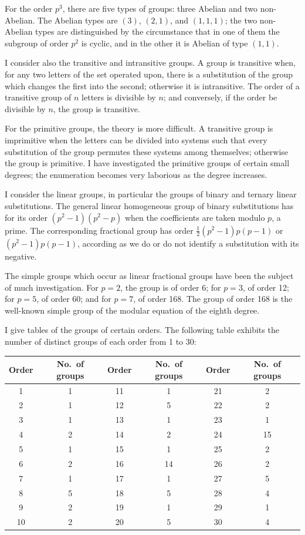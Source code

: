 \documentclass[11pt,a4paper]{book}
\begin{document}
For the order $p^3$, there are five types of groups: three Abelian and two non-Abelian. The Abelian types are $(3)$, $(2,1)$, and $(1,1,1)$; the two non-Abelian types are distinguished by the circumstance that in one of them the subgroup of order $p^2$ is cyclic, and in the other it is Abelian of type $(1,1)$.

I consider also the transitive and intransitive groups. A group is transitive when, for any two letters of the set operated upon, there is a substitution of the group which changes the first into the second; otherwise it is intransitive. The order of a transitive group of $n$ letters is divisible by $n$; and conversely, if the order be divisible by $n$, the group is transitive.

For the primitive groups, the theory is more difficult. A transitive group is imprimitive when the letters can be divided into systems such that every substitution of the group permutes these systems among themselves; otherwise the group is primitive. I have investigated the primitive groups of certain small degrees; the enumeration becomes very laborious as the degree increases.

I consider the linear groups, in particular the groups of binary and ternary linear substitutions. The general linear homogeneous group of binary substitutions has for its order $(p^2-1)(p^2-p)$ when the coefficients are taken modulo $p$, a prime. The corresponding fractional group has order $\tfrac12(p^2-1)p(p-1)$ or $(p^2-1)p(p-1)$, according as we do or do not identify a substitution with its negative.

The simple groups which occur as linear fractional groups have been the subject of much investigation. For $p=2$, the group is of order 6; for $p=3$, of order 12; for $p=5$, of order 60; and for $p=7$, of order 168. The group of order 168 is the well-known simple group of the modular equation of the eighth degree.

I give tables of the groups of certain orders. The following table exhibits the number of distinct groups of each order from 1 to 30:

\begin{center}
\begin{tabular}{|c|c||c|c||c|c|}
\hline
Order & No.\ of groups & Order & No.\ of groups & Order & No.\ of groups \\
\hline
1 & 1 & 11 & 1 & 21 & 2 \\
2 & 1 & 12 & 5 & 22 & 2 \\
3 & 1 & 13 & 1 & 23 & 1 \\
4 & 2 & 14 & 2 & 24 & 15 \\
5 & 1 & 15 & 1 & 25 & 2 \\
6 & 2 & 16 & 14 & 26 & 2 \\
7 & 1 & 17 & 1 & 27 & 5 \\
8 & 5 & 18 & 5 & 28 & 4 \\
9 & 2 & 19 & 1 & 29 & 1 \\
10 & 2 & 20 & 5 & 30 & 4 \\
\hline
\end{tabular}
\end{center}
\end{document}
